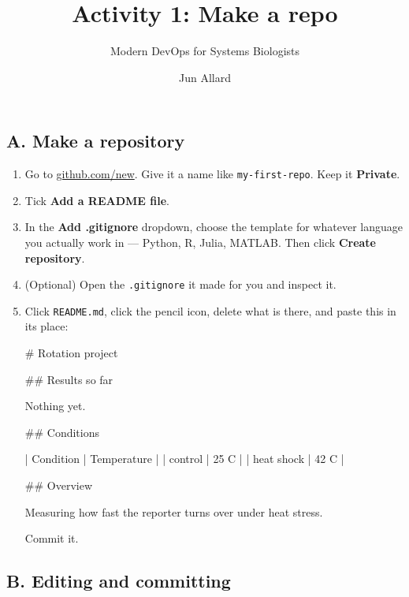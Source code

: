 \documentclass[
  letterpaper,
  DIV=11,
  numbers=noendperiod]{scrartcl}
\title{Activity 1: Make a repo}
\subtitle{Modern DevOps for Systems Biologists}
\author{Jun Allard}
\date{}
\newenvironment{Shaded}{\begin{snugshade}}{\end{snugshade}}
\newcommand{\FunctionTok}[1]{\textcolor[rgb]{0.28,0.35,0.67}{#1}}
\newcommand{\NormalTok}[1]{\textcolor[rgb]{0.00,0.23,0.31}{#1}}
\newcommand{\PreprocessorTok}[1]{\textcolor[rgb]{0.68,0.00,0.00}{#1}}
\begin{document}
\maketitle


\subsection{A. Make a repository}\label{a.-make-a-repository}

\begin{enumerate}
\def\labelenumi{\roman{enumi}.}
\item
  Go to \href{https://github.com/new}{github.com/new}. Give it a name
  like \texttt{my-first-repo}. Keep it \textbf{Private}.
\item
  Tick \textbf{Add a README file}.
\item
  In the \textbf{Add .gitignore} dropdown, choose the template for
  whatever language you actually work in --- Python, R, Julia, MATLAB.
  Then click \textbf{Create repository}.
\item
  (Optional) Open the \texttt{.gitignore} it made for you and inspect
  it.
\item
  Click \texttt{README.md}, click the pencil icon, delete what is there,
  and paste this in its place:

\begin{Shaded}
\begin{Highlighting}[]
\FunctionTok{\# Rotation project}

\FunctionTok{\#\# Results so far}

\NormalTok{Nothing yet.}

\FunctionTok{\#\# Conditions}

\PreprocessorTok{|}\NormalTok{ Condition }\PreprocessorTok{|}\NormalTok{ Temperature }\PreprocessorTok{|}
\PreprocessorTok{|}\NormalTok{ control }\PreprocessorTok{|}\NormalTok{ 25 C }\PreprocessorTok{|}
\PreprocessorTok{|}\NormalTok{ heat shock }\PreprocessorTok{|}\NormalTok{ 42 C }\PreprocessorTok{|}

\FunctionTok{\#\# Overview}

\NormalTok{Measuring how fast the reporter turns over under heat stress.}
\end{Highlighting}
\end{Shaded}

  Commit it.
\end{enumerate}

\subsection{B. Editing and committing}\label{b.-editing-and-committing}
\end{document}
